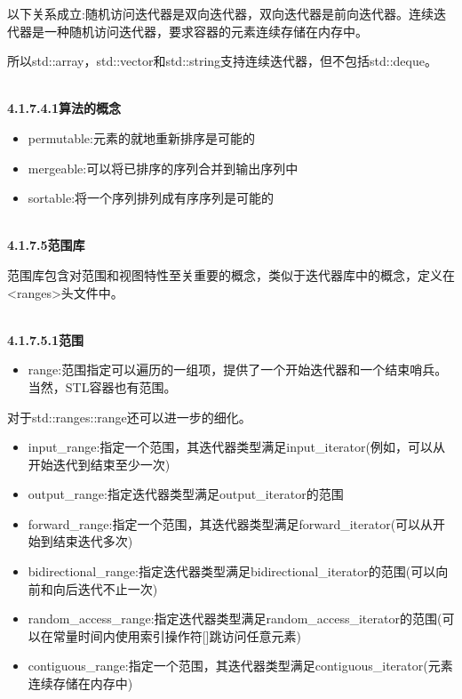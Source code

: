 以下关系成立:随机访问迭代器是双向迭代器，双向迭代器是前向迭代器。连续迭代器是一种随机访问迭代器，要求容器的元素连续存储在内存中。

所以std::array，std::vector和std::string支持连续迭代器，但不包括std::deque。

\hspace*{\fill} \\ %
\noindent
\textbf{4.1.7.4.1\hspace{0.2cm}算法的概念}

\begin{itemize}
\item 
permutable:元素的就地重新排序是可能的

\item 
mergeable:可以将已排序的序列合并到输出序列中

\item 
sortable:将一个序列排列成有序序列是可能的
\end{itemize}

\hspace*{\fill} \\ %
\noindent
\textbf{4.1.7.5\hspace{0.2cm}范围库}

范围库包含对范围和视图特性至关重要的概念，类似于迭代器库中的概念，定义在<ranges>头文件中。

\hspace*{\fill} \\ %
\noindent
\textbf{4.1.7.5.1\hspace{0.2cm}范围}

\begin{itemize}
\item 
range:范围指定可以遍历的一组项，提供了一个开始迭代器和一个结束哨兵。当然，STL容器也有范围。
\end{itemize}

对于std::ranges::range还可以进一步的细化。

\begin{itemize}
\item 
input\_range:指定一个范围，其迭代器类型满足input\_iterator(例如，可以从开始迭代到结束至少一次)

\item 
output\_range:指定迭代器类型满足output\_iterator的范围

\item 
forward\_range:指定一个范围，其迭代器类型满足forward\_iterator(可以从开始到结束迭代多次)

\item 
bidirectional\_range:指定迭代器类型满足bidirectional\_iterator的范围(可以向前和向后迭代不止一次)

\item 
random\_access\_range:指定迭代器类型满足random\_access\_iterator的范围(可以在常量时间内使用索引操作符[]跳访问任意元素)

\item 
contiguous\_range:指定一个范围，其迭代器类型满足contiguous\_iterator(元素连续存储在内存中)
\end{itemize}

